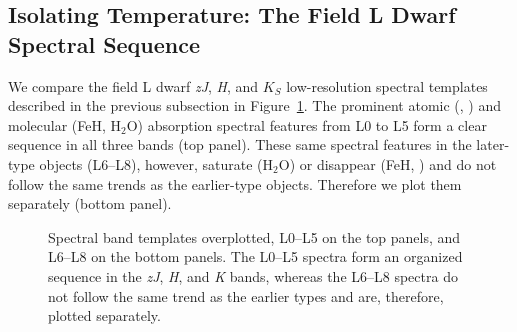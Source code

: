 \documentclass[12pt]{aastex6}
\begin{document}
\clearpage



\subsection{Isolating Temperature: The Field L Dwarf Spectral Sequence}
\label{sec:temp}
We compare the field L dwarf \emph{zJ}, \emph{H}, and $K_S$ low-resolution spectral templates described in the previous subsection in Figure~\ref{fig:spec_sequence}.
The prominent atomic (, ) and molecular (FeH, H$_2$O) absorption spectral features from L0 to L5 form a clear sequence in all three bands (top panel).
These same spectral features in the later-type objects (L6--L8), however, saturate (H$_2$O) or disappear (FeH, ) and do not follow the same trends as the earlier-type objects. Therefore we plot them separately (bottom panel).



\begin{figure}
    \caption{Spectral band templates overplotted, L0--L5 on the top panels, and L6--L8 on the bottom panels.
    The L0--L5 spectra form an organized sequence in the \emph{zJ}, \emph{H}, and \emph{K} bands, whereas the L6--L8 spectra do not follow the same trend as the earlier types and are, therefore, plotted separately.}
    \label{fig:spec_sequence}
\end{figure}
\end{document}
